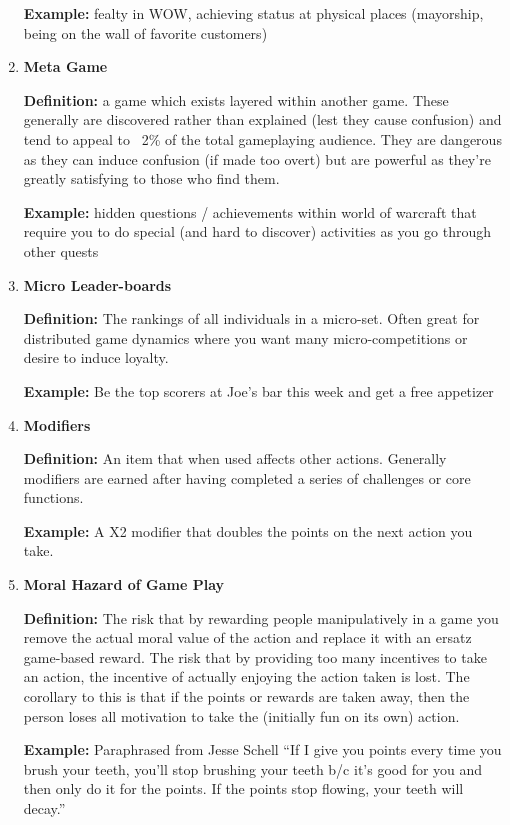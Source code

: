 \begin{enumerate}
\textbf{Example:} fealty in WOW, achieving status at physical places (mayorship, being on the wall of favorite customers)

\item \textbf{Meta Game}

\textbf{Definition:} a game which exists layered within another game. These generally are discovered rather than explained (lest they cause confusion) and tend to appeal to ~2\% of the total gameplaying audience. They are dangerous as they can induce confusion (if made too overt) but are powerful as they’re greatly satisfying to those who find them.

\textbf{Example:} hidden questions / achievements within world of warcraft that require you to do special (and hard to discover) activities as you go through other quests

\item \textbf{Micro Leader-boards}

\textbf{Definition:} The rankings of all individuals in a micro-set. Often great for distributed game dynamics where you want many micro-competitions or desire to induce loyalty.

\textbf{Example:} Be the top scorers at Joe’s bar this week and get a free appetizer

\item \textbf{Modifiers}

\textbf{Definition:} An item that when used affects other actions. Generally modifiers are earned after having completed a series of challenges or core functions.

\textbf{Example:} A X2 modifier that doubles the points on the next action you take.

\item \textbf{Moral Hazard of Game Play}

\textbf{Definition:} The risk that by rewarding people manipulatively in a game you remove the actual moral value of the action and replace it with an ersatz game-based reward. The risk that by providing too many incentives to take an action, the incentive of actually enjoying the action taken is lost. The corollary to this is that if the points or rewards are taken away, then the person loses all motivation to take the (initially fun on its own) action.

\textbf{Example:} Paraphrased from Jesse Schell ``If I give you points every time you brush your teeth, you’ll stop brushing your teeth b/c it’s good for you and then only do it for the points. If the points stop flowing, your teeth will decay.''


\end{enumerate}
